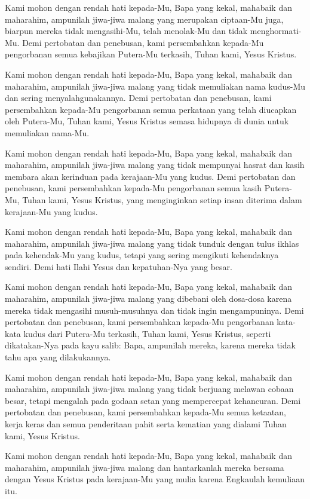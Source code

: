 
Kami mohon dengan rendah hati kepada-Mu, Bapa yang kekal, mahabaik dan maharahim, ampunilah jiwa-jiwa malang yang merupakan ciptaan-Mu juga, biarpun mereka tidak mengasihi-Mu, telah menolak-Mu dan tidak menghormati-Mu. Demi pertobatan dan penebusan, kami persembahkan kepada-Mu pengorbanan semua kebajikan Putera-Mu terkasih, Tuhan kami, Yesus Kristus.

Kami mohon dengan rendah hati kepada-Mu, Bapa yang kekal, mahabaik dan maharahim, ampunilah jiwa-jiwa malang yang tidak memuliakan nama kudus-Mu dan sering menyalahgunakannya. Demi pertobatan dan penebusan, kami persembahkan kepada-Mu pengorbanan semua perkataan yang telah diucapkan oleh Putera-Mu, Tuhan kami, Yesus Kristus semasa hidupnya di dunia untuk memuliakan nama-Mu.

Kami mohon dengan rendah hati kepada-Mu, Bapa yang kekal, mahabaik dan maharahim, ampunilah jiwa-jiwa malang yang tidak mempunyai hasrat dan kasih membara akan kerinduan pada kerajaan-Mu yang kudus. Demi pertobatan dan penebusan, kami persembahkan kepada-Mu pengorbanan semua kasih Putera-Mu, Tuhan kami, Yesus Kristus, yang menginginkan setiap insan diterima dalam kerajaan-Mu yang kudus.

Kami mohon dengan rendah hati kepada-Mu, Bapa yang kekal, mahabaik dan maharahim, ampunilah jiwa-jiwa malang yang tidak tunduk dengan tulus ikhlas pada kehendak-Mu yang kudus, tetapi yang sering mengikuti kehendaknya sendiri. Demi hati Ilahi Yesus dan kepatuhan-Nya yang besar.

Kami mohon dengan rendah hati kepada-Mu, Bapa yang kekal, mahabaik dan maharahim, ampunilah jiwa-jiwa malang yang dibebani oleh dosa-dosa karena mereka tidak mengasihi musuh-musuhnya dan tidak ingin mengampuninya. Demi pertobatan dan penebusan, kami persembahkan kepada-Mu pengorbanan kata-kata kudus dari Putera-Mu terkasih, Tuhan kami, Yesus Kristus, seperti dikatakan-Nya pada kayu salib: Bapa, ampunilah mereka, karena mereka tidak tahu apa yang dilakukannya.

Kami mohon dengan rendah hati kepada-Mu, Bapa yang kekal, mahabaik dan maharahim, ampunilah jiwa-jiwa malang yang tidak berjuang melawan cobaan besar, tetapi mengalah pada godaan setan yang mempercepat kehancuran. Demi pertobatan dan penebusan, kami persembahkan kepada-Mu semua ketaatan, kerja keras dan semua penderitaan pahit serta kematian yang dialami Tuhan kami, Yesus Kristus.

Kami mohon dengan rendah hati kepada-Mu, Bapa yang kekal, mahabaik dan maharahim, ampunilah jiwa-jiwa malang dan hantarkanlah mereka bersama dengan Yesus Kristus pada kerajaan-Mu yang mulia karena Engkaulah kemuliaan itu.
